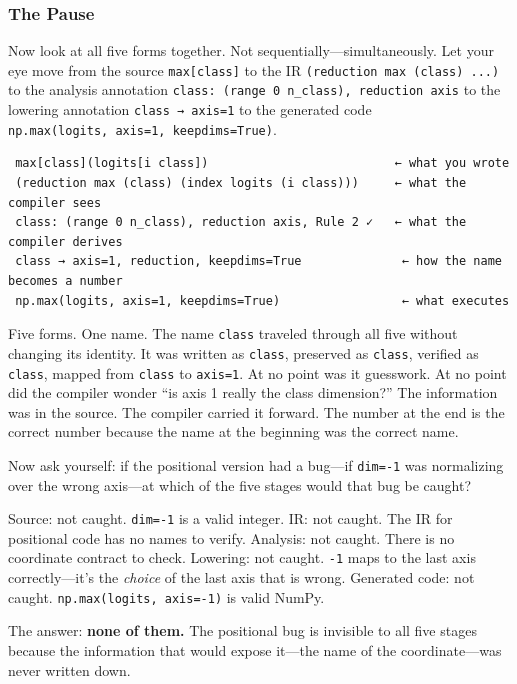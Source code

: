 \documentclass[11pt,titlepage]{article}
\begin{document}
\hypertarget{the-pause}{%
\subsubsection{The Pause}\label{the-pause}}

Now look at all five forms together. Not sequentially---simultaneously.
Let your eye move from the source \texttt{max{[}class{]}} to the IR
\texttt{(reduction\ max\ (class)\ ...)} to the analysis annotation
\texttt{class:\ (range\ 0\ n\_class),\ reduction\ axis} to the lowering
annotation \texttt{class\ →\ axis=1} to the generated code
\texttt{np.max(logits,\ axis=1,\ keepdims=True)}.

\begin{verbatim}
 max[class](logits[i class])                          ← what you wrote
 (reduction max (class) (index logits (i class)))     ← what the compiler sees
 class: (range 0 n_class), reduction axis, Rule 2 ✓   ← what the compiler derives
 class → axis=1, reduction, keepdims=True              ← how the name becomes a number
 np.max(logits, axis=1, keepdims=True)                 ← what executes
\end{verbatim}

Five forms. One name. The name \texttt{class} traveled through all five
without changing its identity. It was written as \texttt{class},
preserved as \texttt{class}, verified as \texttt{class}, mapped from
\texttt{class} to \texttt{axis=1}. At no point was it guesswork. At no
point did the compiler wonder ``is axis 1 really the class dimension?''
The information was in the source. The compiler carried it forward. The
number at the end is the correct number because the name at the
beginning was the correct name.

Now ask yourself: if the positional version had a bug---if
\texttt{dim=-1} was normalizing over the wrong axis---at which of the
five stages would that bug be caught?

Source: not caught. \texttt{dim=-1} is a valid integer. IR: not caught.
The IR for positional code has no names to verify. Analysis: not caught.
There is no coordinate contract to check. Lowering: not caught.
\texttt{-1} maps to the last axis correctly---it's the \emph{choice} of
the last axis that is wrong. Generated code: not caught.
\texttt{np.max(logits,\ axis=-1)} is valid NumPy.

The answer: \textbf{none of them.} The positional bug is invisible to
all five stages because the information that would expose it---the name
of the coordinate---was never written down.
\end{document}
